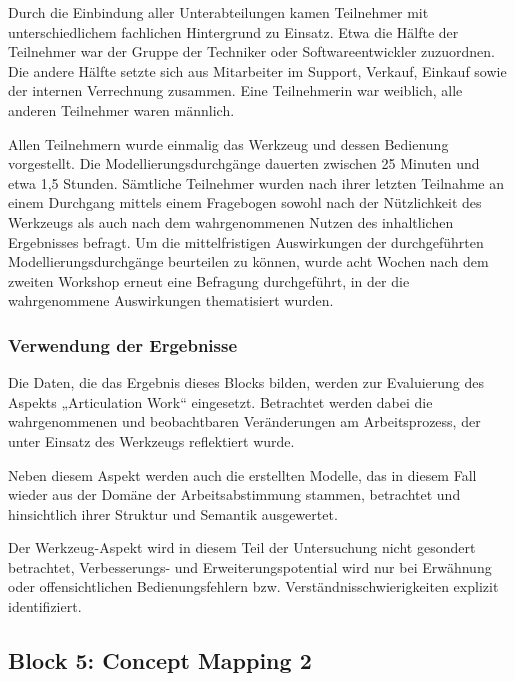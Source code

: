 Durch die Einbindung aller Unterabteilungen kamen Teilnehmer mit unterschiedlichem fachlichen Hintergrund zu Einsatz. Etwa die Hälfte der Teilnehmer war der Gruppe der Techniker oder Softwareentwickler zuzuordnen. Die andere Hälfte setzte sich aus Mitarbeiter im Support, Verkauf, Einkauf sowie der internen Verrechnung zusammen. Eine Teilnehmerin war weiblich, alle anderen Teilnehmer waren männlich.

Allen Teilnehmern wurde einmalig das Werkzeug und dessen Bedienung vorgestellt. Die Modellierungsdurchgänge dauerten zwischen 25 Minuten und etwa 1,5 Stunden. Sämtliche Teilnehmer wurden nach ihrer letzten Teilnahme an einem Durchgang mittels einem Fragebogen sowohl nach der Nützlichkeit des Werkzeugs als auch nach dem wahrgenommenen Nutzen des inhaltlichen Ergebnisses befragt. Um die mittelfristigen Auswirkungen der durchgeführten Modellierungsdurchgänge beurteilen zu können, wurde acht Wochen nach dem zweiten Workshop erneut eine Befragung durchgeführt, in der die wahrgenommene Auswirkungen thematisiert wurden. 


\subsubsection{Verwendung der Ergebnisse} %
\label{ssub:4_verwendung_der_ergebnisse}

Die Daten, die das Ergebnis dieses Blocks bilden, werden zur Evaluierung des Aspekts „Articulation Work“ eingesetzt. Betrachtet werden dabei die wahrgenommenen und beobachtbaren Veränderungen am Arbeitsprozess, der unter Einsatz des Werkzeugs reflektiert wurde.

Neben diesem Aspekt werden auch die erstellten Modelle, das in diesem Fall wieder aus der Domäne der Arbeitsabstimmung stammen, betrachtet und hinsichtlich ihrer Struktur und Semantik ausgewertet. 

Der Werkzeug-Aspekt wird in diesem Teil der Untersuchung nicht gesondert betrachtet, Verbesserungs- und Erweiterungspotential wird nur bei Erwähnung oder offensichtlichen Bedienungsfehlern bzw. Verständnisschwierigkeiten explizit identifiziert.


\subsection{Block 5: Concept Mapping 2}
\label{sub:eval_5}

